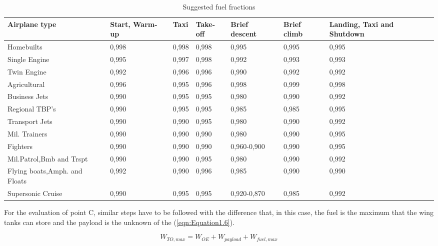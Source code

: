 \bigskip
\begin{table}[!ht]
\centering
\begin{tabular}{p{2.7cm}p{1.8cm}p{1.1cm}p{1.7cm}p{2.4cm}p{1.2cm}p{2.1cm}}
\toprule
\textbf{Airplane type} & \textbf{Start}, \textbf{Warm-up} & \textbf{Taxi} & \textbf{Take-off} & \textbf{Brief descent} & \textbf{Brief climb} & \textbf{Landing, Taxi and Shutdown} \\
\midrule
Homebuilts                     & 0,998 & 0,998 & 0,998 & 0,995 & 0,995 & 0,995       \\[0.7cm]
Single Engine                  & 0,995 & 0,997 & 0,998 & 0,992 & 0,993 & 0,993       \\[0.7cm]
Twin Engine                    & 0,992 & 0,996 & 0,996 & 0,990 & 0,992 & 0,992       \\[0.7cm]
Agricultural                   & 0,996 & 0,995 & 0,996 & 0,998 & 0,999 & 0,998       \\[0.7cm]
Business Jets                  & 0,990 & 0,995 & 0,995 & 0,980 & 0,990 & 0,992       \\[0.7cm]
Regional TBP's                 & 0,990 & 0,995 & 0,995 & 0,985 & 0,985 & 0,995       \\[0.7cm]
Transport Jets                 & 0,990 & 0,990 & 0,995 & 0,980 & 0,990 & 0,992       \\[0.7cm]
Mil. Trainers                  & 0,990 & 0,990 & 0,990 & 0,980 & 0,990 & 0,995       \\[0.7cm]
Fighters                       & 0,990 & 0,990 & 0,990 & 0,960-0,900 & 0,990 & 0,995     \\[0.7cm]
Mil.Patrol,Bmb and Trspt       & 0,990 & 0,990 & 0,995 & 0,980 & 0,990 & 0,992       \\[0.7cm]
Flying boats,Amph. and Floats  & 0,992 & 0,990 & 0,996 & 0,985 & 0,990 & 0,990       \\[1.2	cm]
Supersonic Cruise              & 0,990 & 0,995 & 0,995 & 0,920-0,870 & 0,985 & 0,992     \\[0.1	cm]
\bottomrule
\end{tabular}
\caption{Suggested fuel fractions}
\label{table:Table1}
\end{table}


For the evaluation of point C, similar steps have to be followed with the difference that, in this case, the fuel is the maximum that the wing tanks can store and the payload is the unknown of the (\ref{eqn:Equation1.6}).

\begin{equation}
W_{TO,max}=W_{OE}+W_{payload}+W_{fuel,max}
\label{eqn:Equation1.6}
\end{equation}

